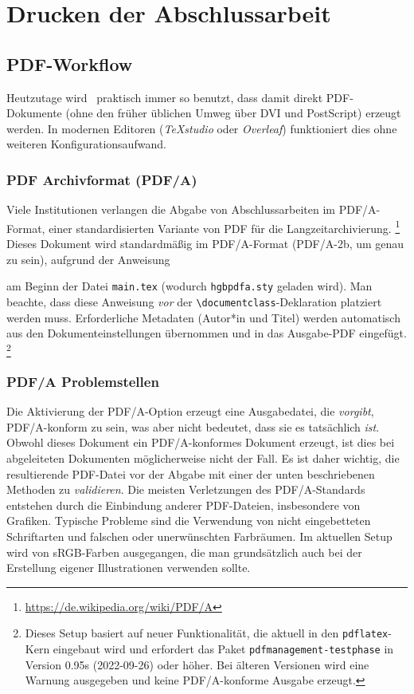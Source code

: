 \chapter{Drucken der Abschlussarbeit}
\label{cha:Drucken}


\section{PDF-Workflow}
\label{sec:pdf}

Heutzutage wird \latex\ praktisch immer so benutzt, dass damit direkt PDF-Dokumente
(ohne den früher üblichen Umweg über DVI und PostScript) erzeugt werden.
In modernen Editoren (\zB \emph{TeXstudio} oder \emph{Overleaf}) funktioniert dies
ohne weiteren Konfigurationsaufwand.


\subsection{PDF Archivformat (PDF/A)}
\label{sec:PDFA}

Viele Institutionen verlangen die Abgabe von Abschlussarbeiten im PDF/A-Format, einer
standardisierten Variante von PDF für die Langzeitarchivierung.%
\footnote{\url{https://de.wikipedia.org/wiki/PDF/A}}
Dieses Dokument wird standardmäßig im PDF/A-Format (PDF/A-2b, um genau zu sein),
aufgrund der Anweisung
%
\begin{LaTeXCode}[numbers=none]
\RequirePackage{hgbpdfa}
\end{LaTeXCode}
%
am Beginn der Datei \verb!main.tex! (wodurch \verb!hgbpdfa.sty! geladen wird).
Man beachte, dass diese Anweisung \emph{vor} der \verb!\documentclass!-Deklaration
platziert werden muss. Erforderliche Meta\-daten (\zB Autor*in und Titel) werden
automatisch aus den Dokumenteinstellungen übernommen und in das Ausgabe-PDF eingefügt.%
\footnote{Dieses Setup basiert auf neuer Funktionalität, die aktuell in den
\texttt{pdflatex}-Kern eingebaut wird und erfordert das Paket 
\texttt{pdfmanagement-testphase} in Version 0.95s (2022-09-26) oder höher.
Bei älteren Versionen wird eine Warnung ausgegeben und keine PDF/A-konforme
Ausgabe erzeugt.}


\subsection{PDF/A Problemstellen}
\label{sec:PDFA-issues}

Die Aktivierung der PDF/A-Option erzeugt eine Ausgabedatei, die \emph{vorgibt},
PDF/A-konform zu sein, was aber nicht bedeutet, dass sie es tatsächlich \emph{ist}.
Obwohl dieses Dokument ein PDF/A-konformes Dokument erzeugt, ist dies bei abgeleiteten
Dokumenten möglicherweise nicht der Fall. Es ist daher wichtig, die resultierende
PDF-Datei vor der Abgabe mit einer der unten beschriebenen Methoden zu 
\emph{validieren}. Die meisten Verletzungen des PDF/A-Standards entstehen durch 
die Einbindung anderer PDF-Dateien, insbesondere von Grafiken. Typische Probleme 
sind die Verwendung von nicht eingebetteten Schriftarten und falschen oder 
unerwünschten Farbräumen. Im aktuellen Setup wird von sRGB-Farben ausgegangen, die man
grundsätzlich auch bei der Erstellung eigener Illustrationen verwenden sollte.

